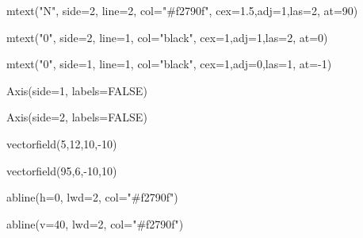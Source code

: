 \documentclass[
  a4paper,
]{scrbook}
\newenvironment{Shaded}{\begin{snugshade}}{\end{snugshade}}
\newcommand{\AttributeTok}[1]{\textcolor[rgb]{0.40,0.45,0.13}{#1}}
\newcommand{\ConstantTok}[1]{\textcolor[rgb]{0.56,0.35,0.01}{#1}}
\newcommand{\DecValTok}[1]{\textcolor[rgb]{0.68,0.00,0.00}{#1}}
\newcommand{\FloatTok}[1]{\textcolor[rgb]{0.68,0.00,0.00}{#1}}
\newcommand{\FunctionTok}[1]{\textcolor[rgb]{0.28,0.35,0.67}{#1}}
\newcommand{\NormalTok}[1]{\textcolor[rgb]{0.00,0.23,0.31}{#1}}
\newcommand{\SpecialCharTok}[1]{\textcolor[rgb]{0.37,0.37,0.37}{#1}}
\newcommand{\StringTok}[1]{\textcolor[rgb]{0.13,0.47,0.30}{#1}}
\theoremstyle{definition}
\theoremstyle{remark}
\begin{document}
\begin{Shaded}
\begin{Highlighting}[]
\FunctionTok{mtext}\NormalTok{(}\StringTok{"N"}\NormalTok{, }\AttributeTok{side=}\DecValTok{2}\NormalTok{, }\AttributeTok{line=}\DecValTok{2}\NormalTok{, }\AttributeTok{col=}\StringTok{"\#f2790f"}\NormalTok{, }\AttributeTok{cex=}\FloatTok{1.5}\NormalTok{,}\AttributeTok{adj=}\DecValTok{1}\NormalTok{,}\AttributeTok{las=}\DecValTok{2}\NormalTok{, }\AttributeTok{at=}\DecValTok{90}\NormalTok{)}

\FunctionTok{mtext}\NormalTok{(}\StringTok{"0"}\NormalTok{, }\AttributeTok{side=}\DecValTok{2}\NormalTok{, }\AttributeTok{line=}\DecValTok{1}\NormalTok{, }\AttributeTok{col=}\StringTok{"black"}\NormalTok{, }\AttributeTok{cex=}\DecValTok{1}\NormalTok{,}\AttributeTok{adj=}\DecValTok{1}\NormalTok{,}\AttributeTok{las=}\DecValTok{2}\NormalTok{, }\AttributeTok{at=}\DecValTok{0}\NormalTok{)}

\FunctionTok{mtext}\NormalTok{(}\StringTok{"0"}\NormalTok{, }\AttributeTok{side=}\DecValTok{1}\NormalTok{, }\AttributeTok{line=}\DecValTok{1}\NormalTok{, }\AttributeTok{col=}\StringTok{"black"}\NormalTok{, }\AttributeTok{cex=}\DecValTok{1}\NormalTok{,}\AttributeTok{adj=}\DecValTok{0}\NormalTok{,}\AttributeTok{las=}\DecValTok{1}\NormalTok{, }\AttributeTok{at=}\SpecialCharTok{{-}}\DecValTok{1}\NormalTok{)}

\FunctionTok{Axis}\NormalTok{(}\AttributeTok{side=}\DecValTok{1}\NormalTok{, }\AttributeTok{labels=}\ConstantTok{FALSE}\NormalTok{)}

\FunctionTok{Axis}\NormalTok{(}\AttributeTok{side=}\DecValTok{2}\NormalTok{, }\AttributeTok{labels=}\ConstantTok{FALSE}\NormalTok{)}

\FunctionTok{vectorfield}\NormalTok{(}\DecValTok{5}\NormalTok{,}\DecValTok{12}\NormalTok{,}\DecValTok{10}\NormalTok{,}\SpecialCharTok{{-}}\DecValTok{10}\NormalTok{)}

\FunctionTok{vectorfield}\NormalTok{(}\DecValTok{95}\NormalTok{,}\DecValTok{6}\NormalTok{,}\SpecialCharTok{{-}}\DecValTok{10}\NormalTok{,}\DecValTok{10}\NormalTok{)}

 \FunctionTok{abline}\NormalTok{(}\AttributeTok{h=}\DecValTok{0}\NormalTok{, }\AttributeTok{lwd=}\DecValTok{2}\NormalTok{, }\AttributeTok{col=}\StringTok{"\#f2790f"}\NormalTok{)}

 \FunctionTok{abline}\NormalTok{(}\AttributeTok{v=}\DecValTok{40}\NormalTok{, }\AttributeTok{lwd=}\DecValTok{2}\NormalTok{, }\AttributeTok{col=}\StringTok{"\#f2790f"}\NormalTok{)}
\end{Highlighting}
\end{Shaded}
\end{document}
